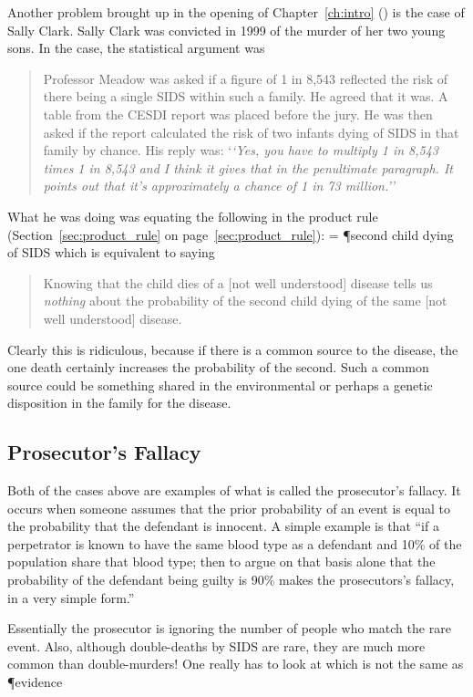 Another problem brought up in the opening of Chapter~\ref{ch:intro} () is the case of Sally Clark.  Sally Clark was convicted in 1999 of the murder of her two young sons\cite{KAY:2003uq}.  In the case, the statistical argument was
\begin{quote}
Professor Meadow was asked if a figure of 1 in 8,543 reflected the risk of there being a single SIDS within such a family. He agreed that it was. A table from the CESDI report was placed before the jury. He was then asked if the report calculated the risk of two infants dying of SIDS in that family by chance. His reply was:
`\emph{`Yes, you have to multiply 1 in 8,543 times 1 in 8,543 and I think it gives that in the penultimate paragraph. It points out that it's approximately a chance of 1 in 73 million.''
}\end{quote}

What he was doing was equating the following in the product rule (Section~\ref{sec:product_rule} on page~\ref{sec:product_rule}):
\beqn
{} = \P{second child dying of SIDS}
\eeqn
which is equivalent to saying
\begin{quote}
Knowing that the child dies of a [not well understood] disease tells us \emph{nothing} about the probability of the second child dying of the same [not well understood] disease.
\end{quote}
Clearly this is ridiculous, because if there is a common source to the disease, the one death certainly increases the probability of the second.  Such a common source could be something shared in the environmental or perhaps a genetic disposition in the family for the disease.


\subsection{Prosecutor's Fallacy}

Both of the cases above are examples of what is called the prosecutor's fallacy.  It occurs when someone assumes that the prior probability of an event is equal to the probability that the defendant is innocent.  A simple example is that ``if a perpetrator is known to have the same blood type as a defendant and 10\% of the population share that blood type; then to argue on that basis alone that the probability of the defendant being guilty is 90\% makes the prosecutors's fallacy, in a very simple form.''\cite{Wikipedia:2014fk}

Essentially the prosecutor is ignoring the number of people who match the rare event.  Also, although double-deaths by SIDS are rare, they are much more common than double-murders!  One really has to look at 
\beqn
{}
\eeqn
which is not the same as
\beqn
\P{evidence}
\eeqn




